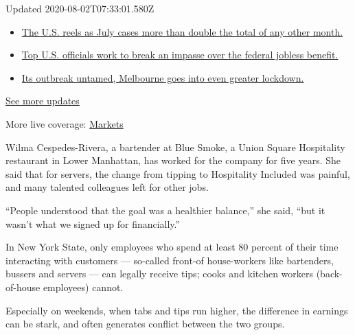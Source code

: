 Updated 2020-08-02T07:33:01.580Z

\begin{itemize}
\tightlist
\item
  \href{https://www.nytimes3xbfgragh.onion/2020/08/01/world/coronavirus-covid-19.html?action=click\&pgtype=Article\&state=default\&region=MAIN_CONTENT_1\&context=storylines_live_updates\#link-34047410}{The
  U.S. reels as July cases more than double the total of any other
  month.}
\item
  \href{https://www.nytimes3xbfgragh.onion/2020/08/01/world/coronavirus-covid-19.html?action=click\&pgtype=Article\&state=default\&region=MAIN_CONTENT_1\&context=storylines_live_updates\#link-780ec966}{Top
  U.S. officials work to break an impasse over the federal jobless
  benefit.}
\item
  \href{https://www.nytimes3xbfgragh.onion/2020/08/01/world/coronavirus-covid-19.html?action=click\&pgtype=Article\&state=default\&region=MAIN_CONTENT_1\&context=storylines_live_updates\#link-2bc8948}{Its
  outbreak untamed, Melbourne goes into even greater lockdown.}
\end{itemize}

\href{https://www.nytimes3xbfgragh.onion/2020/08/01/world/coronavirus-covid-19.html?action=click\&pgtype=Article\&state=default\&region=MAIN_CONTENT_1\&context=storylines_live_updates}{See
more updates}

More live coverage:
\href{https://www.nytimes3xbfgragh.onion/live/2020/07/31/business/stock-market-today-coronavirus?action=click\&pgtype=Article\&state=default\&region=MAIN_CONTENT_1\&context=storylines_live_updates}{Markets}

Wilma Cespedes-Rivera, a bartender at Blue Smoke, a Union Square
Hospitality restaurant in Lower Manhattan, has worked for the company
for five years. She said that for servers, the change from tipping to
Hospitality Included was painful, and many talented colleagues left for
other jobs.

``People understood that the goal was a healthier balance,'' she said,
``but it wasn't what we signed up for financially.''

In New York State, only employees who spend at least 80 percent of their
time interacting with customers --- so-called front-of house-workers
like bartenders, bussers and servers --- can legally receive tips; cooks
and kitchen workers (back-of-house employees) cannot.

Especially on weekends, when tabs and tips run higher, the difference in
earnings can be stark, and often generates conflict between the two
groups.

